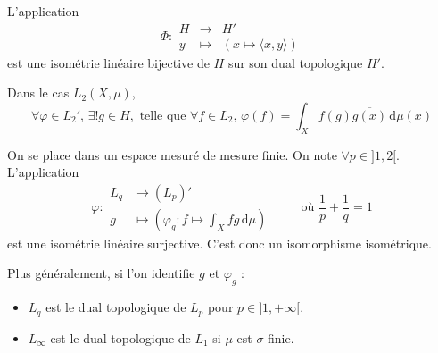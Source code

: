 
  \begin{theorem}
    L'application
    \[
    \Phi :
    \begin{array}{ccc}
      H &\rightarrow& H' \\
      y &\mapsto& (x \mapsto \langle x, y \rangle)
    \end{array}
    \]
    est une isométrie linéaire bijective de $H$ sur son dual topologique $H'$.
  \end{theorem}

  \begin{example}
    Dans le cas $L_2(X, \mu)$,
    \[ \forall \varphi \in L_2', \, \exists! g \in H, \text{ telle que } \forall f \in L_2, \, \varphi(f) = \int_X f(g) \overline{g(x)} \, \mathrm{d}\mu(x) \]
  \end{example}


  \begin{theorem}[Dual de $L_p$]
    On se place dans un espace mesuré de mesure finie. On note $\forall p \in ]1,2[$. L'application
    \[
    \varphi :
    \begin{array}{ll}
      L_q &\rightarrow (L_p)' \\
      g &\mapsto \left( \varphi_g : f \mapsto \int_X f g \, \mathrm{d}\mu \right)
    \end{array}
    \qquad \text{ où } \frac{1}{p} + \frac{1}{q} = 1
    \]
    est une isométrie linéaire surjective. C'est donc un isomorphisme isométrique.
  \end{theorem}


  \begin{remark}
    Plus généralement, si l'on identifie $g$ et $\varphi_g$ :
    \begin{itemize}
      \item $L_q$ est le dual topologique de $L_p$ pour $p \in ]1, +\infty[$.
      \item $L_\infty$ est le dual topologique de $L_1$ si $\mu$ est $\sigma$-finie.
    \end{itemize}
  \end{remark}

